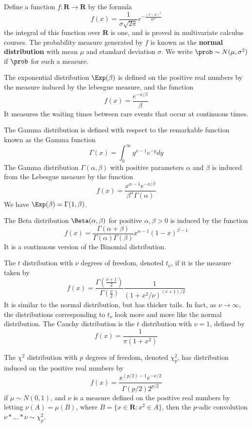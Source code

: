 \begin{example}
    Define a function $f:\mathbf{R} \to \mathbf{R}$ by the formula
    \[ f(x) = \frac{1}{\sigma \sqrt{2\pi}} e^{-\frac{(x - \mu)^2}{2\sigma^2}} \]
    the integral of this function over $\mathbf{R}$ is one, and is proved in multivariate calculus courses. The probability measure generated by $f$ is known as the {\bf normal distribution} with mean $\mu$ and standard deviation $\sigma$. We write $\prob \sim N(\mu, \sigma^2)$ if $\prob$ for such a measure.
\end{example}

\begin{example}
    The exponential distribution $\Exp(\beta)$ is defined on the positive real numbers by the measure induced by the lebesgue measure, and the function
    \[ f(x) = \frac{e^{-x/\beta}}{\beta} \]
    It measures the waiting times between rare events that occur at continuous times.
\end{example}

\begin{example}
    The Gamma distribution is defined with respect to the remarkable function known as the Gamma function
    \[ \Gamma(x) = \int_0^\infty y^{x-1} e^{-y} dy \]
    The Gamma distribution $\Gamma(\alpha, \beta)$ with positive parameters $\alpha$ and $\beta$ is induced from the Lebesgue measure by the function
    \[ f(x) = \frac{x^{\alpha-1} e^{-x/\beta}}{\beta^\alpha \Gamma(\alpha)} \]
    We have $\Exp(\beta) = \Gamma(1,\beta)$.
\end{example}

\begin{example}
    The Beta distribution $\Beta(\alpha, \beta)$ for positive $\alpha, \beta > 0$ is induced by the function
    \[ f(x) = \frac{\Gamma(\alpha + \beta)}{\Gamma(\alpha) \Gamma(\beta)} x^{\alpha-1} (1 - x)^{\beta - 1} \]
    It is a continuous version of the Binomial distribution.
\end{example}

\begin{example}
    The $t$ distribution with $\nu$ degrees of freedom, denoted $t_\nu$, if it is the measure taken by
    \[ f(x) = \frac{\Gamma(\frac{\nu + 1}{2})}{\Gamma(\frac{\nu}{2})} \frac{1}{(1 + x^2/\nu)^{(\nu+1)/2}} \]
    It is similar to the normal distribution, but has thicker tails. In fact, as $\nu \to \infty$, the distributions corresponding to $t_\nu$ look more and more like the normal distribution. The Cauchy distribution is the $t$ distribution with $\nu = 1$, defined by
    \[ f(x) = \frac{1}{\pi(1 + x^2)} \]
\end{example}

\begin{example}
    The $\chi^2$ distribution with $p$ degrees of freedom, denoted $\chi_p^2$, has distribution induced on the positive real numbers by
    \[ f(x) = \frac{x^{(p/2) - 1} e^{-x/2}}{\Gamma(p/2) 2^{p/2}} \]
    if $\mu \sim N(0, 1)$, and $\nu$ is a measure defined on the positive real numbers by letting $\nu(A) = \mu(B)$, where $B = \{ x \in \mathbf{R}: x^2 \in A \}$, then the $p$-adic convolution $\nu * \dots * \nu \sim \chi_p^2$.
\end{example}